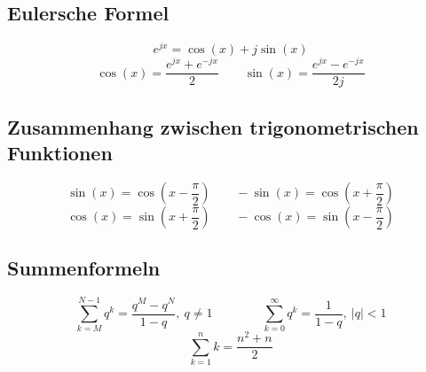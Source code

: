 \documentclass[10pt,a4paper]{article}
\begin{document}
\subsection*{Eulersche Formel}
\[ e^{jx} = \cos(x) + j\sin(x) \]
\[ \cos(x) = \frac{e^{jx}+e^{-jx}}{2} \qquad \sin(x) = \frac{e^{jx} - e^{-jx}}{2j} \]

\subsection*{Zusammenhang zwischen trigonometrischen Funktionen}
\[ \sin(x) = \cos\left(x - \frac{\pi}{2}\right) \qquad -\sin(x) = \cos\left(x + \frac{\pi}{2}\right) \]
\[ \cos(x) = \sin\left(x + \frac{\pi}{2}\right) \qquad -\cos(x) = \sin\left(x - \frac{\pi}{2}\right) \]

\subsection*{Summenformeln}
\[ \sum_{k = M}^{N - 1} q^k = \frac{q^M - q^N}{1 - q}, ~ q \neq 1  \qquad \qquad \sum_{k = 0}^{\infty} q^k = \frac{1}{1 - q}, ~ |q| < 1 \]
\[ \sum_{k = 1}^{n} k = \frac{n^2 + n}{2} \]
\end{document}
